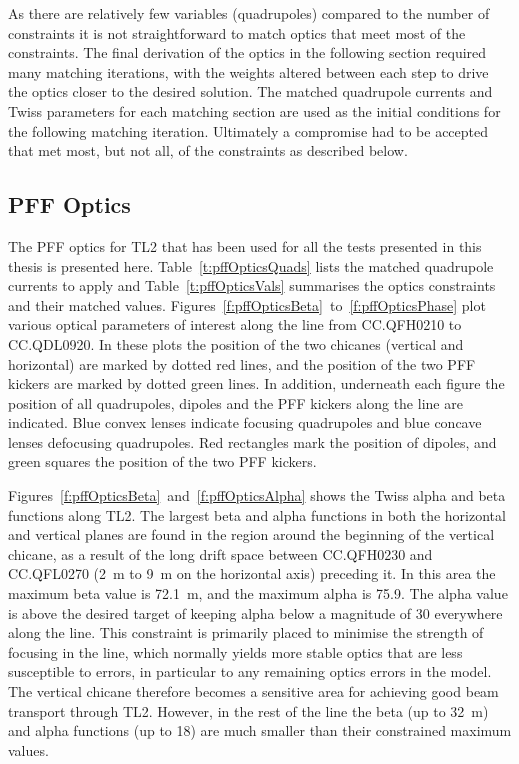 As there are relatively few variables (quadrupoles) compared to the number of constraints  it is not straightforward to match optics that meet most of the constraints. The final derivation of the optics in the following section required many matching iterations, with the weights altered between each step to drive the optics closer to the desired solution. The matched quadrupole currents and Twiss parameters for each matching section are used as the initial conditions for the following matching iteration. Ultimately a compromise had to be accepted that met most, but not all, of the constraints as described below.

\subsection{PFF Optics}
\label{ss:tl2PFFOptics}

The PFF optics for TL2 that has been used for all the tests presented in this thesis is presented here. Table~\ref{t:pffOpticsQuads} lists the matched quadrupole currents to apply and Table~\ref{t:pffOpticsVals} summarises the optics constraints and their matched values. Figures~\ref{f:pffOpticsBeta}~to~\ref{f:pffOpticsPhase} plot various optical parameters of interest along the line from CC.QFH0210 to CC.QDL0920. In these plots the position of the two chicanes (vertical and horizontal) are marked by dotted red lines, and the position of the two PFF kickers are marked by dotted green lines. In addition, underneath each figure the position of all quadrupoles, dipoles and the PFF kickers along the line are indicated. Blue convex lenses indicate focusing quadrupoles and blue concave lenses defocusing quadrupoles. Red rectangles mark the position of dipoles, and green squares the position of the two PFF kickers.

Figures~\ref{f:pffOpticsBeta}~and~\ref{f:pffOpticsAlpha} shows the Twiss alpha and beta functions along TL2. The largest beta and alpha functions in both the horizontal and vertical planes are found in the region around the beginning of the vertical chicane, as a result of the long drift space between CC.QFH0230 and CC.QFL0270 (2~m to 9~m on the horizontal axis) preceding it. In this area the maximum beta value is 72.1~m, and the maximum alpha is 75.9. The alpha value is above the desired target of keeping alpha below a magnitude of 30 everywhere along the line. This constraint is primarily placed to minimise the strength of focusing in the line, which normally yields more stable optics that are less susceptible to errors, in particular to any remaining optics errors in the model. The vertical chicane therefore becomes a sensitive area for achieving good beam transport through TL2. However, in the rest of the line the beta (up to 32~m) and alpha functions (up to 18) are much smaller than their constrained maximum values.

